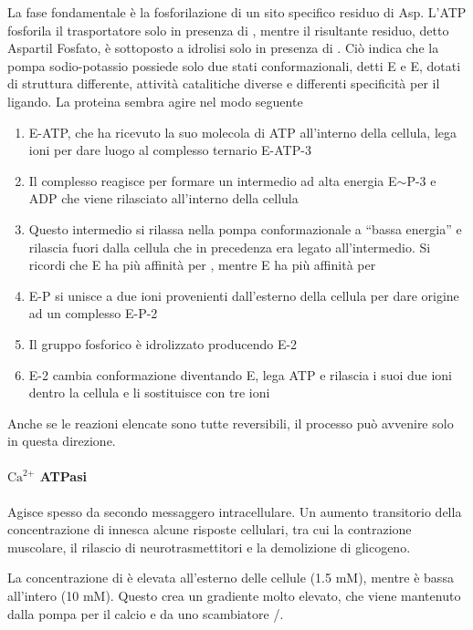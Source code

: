 La fase fondamentale è la fosforilazione di un sito specifico residuo di Asp. L'ATP fosforila il trasportatore solo in presenza di , mentre il risultante residuo, detto Aspartil Fosfato, è sottoposto a idrolisi solo in presenza di . Ciò indica che la pompa sodio-potassio possiede solo due stati conformazionali, detti E e E, dotati di struttura differente, attività catalitiche diverse e differenti specificità per il ligando. La proteina sembra agire nel modo seguente
\begin{enumerate}
\item E-ATP, che ha ricevuto la suo molecola di ATP all'interno della cellula, lega ioni  per dare luogo al complesso ternario E-ATP-3 
\item Il complesso reagisce per formare un intermedio ad alta energia E$\sim$P-3  e ADP che viene rilasciato all'interno della cellula
\item Questo intermedio si rilassa nella pompa conformazionale a ``bassa energia'' e rilascia fuori dalla cellula  che in precedenza era legato all'intermedio. Si ricordi che E ha più affinità per , mentre E ha più affinità per 
\item E-P si unisce a due ioni  provenienti dall'esterno della cellula per dare origine ad un complesso E-P-2 
\item Il gruppo fosforico è idrolizzato producendo E-2 
\item E-2  cambia conformazione diventando E, lega ATP e rilascia i suoi due ioni  dentro la cellula e li sostituisce con tre ioni 
\end{enumerate}

Anche se le reazioni elencate sono tutte reversibili, il processo può avvenire solo in questa direzione.

\paragraph{\texorpdfstring{$ \text{Ca}^{\text{2+}} $}{Ca2+} ATPasi}

Agisce spesso da secondo messaggero intracellulare. Un aumento transitorio della concentrazione di  innesca alcune risposte cellulari, tra cui la contrazione muscolare, il rilascio di neurotrasmettitori e la demolizione di glicogeno.

La concentrazione di  è elevata all'esterno delle cellule (1.5 mM), mentre è bassa all'intero (10 mM). Questo crea un gradiente molto elevato, che viene mantenuto dalla pompa per il calcio e da uno scambiatore /.

